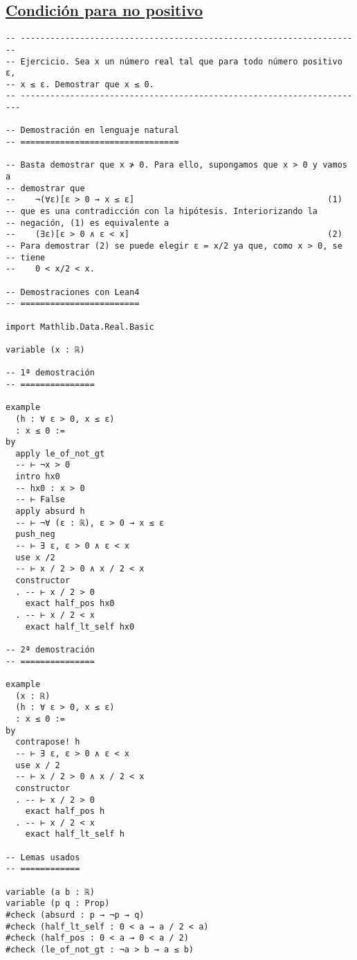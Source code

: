 \subsection{\href{./src/Logica/Condicion\_para\_no\_positivo.lean}{Condición para no positivo}}
\label{sec:orgb3d5b79}
\begin{verbatim}
-- ---------------------------------------------------------------------
-- Ejercicio. Sea x un número real tal que para todo número positivo ε,
-- x ≤ ε. Demostrar que x ≤ 0.
-- ----------------------------------------------------------------------

-- Demostración en lenguaje natural
-- ================================

-- Basta demostrar que x ≯ 0. Para ello, supongamos que x > 0 y vamos a
-- demostrar que
--    ¬(∀ε)[ε > 0 → x ≤ ε]                                       (1)
-- que es una contradicción con la hipótesis. Interiorizando la
-- negación, (1) es equivalente a
--    (∃ε)[ε > 0 ∧ ε < x]                                        (2)
-- Para demostrar (2) se puede elegir ε = x/2 ya que, como x > 0, se
-- tiene
--    0 < x/2 < x.

-- Demostraciones con Lean4
-- ========================

import Mathlib.Data.Real.Basic

variable (x : ℝ)

-- 1ª demostración
-- ===============

example
  (h : ∀ ε > 0, x ≤ ε)
  : x ≤ 0 :=
by
  apply le_of_not_gt
  -- ⊢ ¬x > 0
  intro hx0
  -- hx0 : x > 0
  -- ⊢ False
  apply absurd h
  -- ⊢ ¬∀ (ε : ℝ), ε > 0 → x ≤ ε
  push_neg
  -- ⊢ ∃ ε, ε > 0 ∧ ε < x
  use x /2
  -- ⊢ x / 2 > 0 ∧ x / 2 < x
  constructor
  . -- ⊢ x / 2 > 0
    exact half_pos hx0
  . -- ⊢ x / 2 < x
    exact half_lt_self hx0

-- 2ª demostración
-- ===============

example
  (x : ℝ)
  (h : ∀ ε > 0, x ≤ ε)
  : x ≤ 0 :=
by
  contrapose! h
  -- ⊢ ∃ ε, ε > 0 ∧ ε < x
  use x / 2
  -- ⊢ x / 2 > 0 ∧ x / 2 < x
  constructor
  . -- ⊢ x / 2 > 0
    exact half_pos h
  . -- ⊢ x / 2 < x
    exact half_lt_self h

-- Lemas usados
-- ============

variable (a b : ℝ)
variable (p q : Prop)
#check (absurd : p → ¬p → q)
#check (half_lt_self : 0 < a → a / 2 < a)
#check (half_pos : 0 < a → 0 < a / 2)
#check (le_of_not_gt : ¬a > b → a ≤ b)
\end{verbatim}


